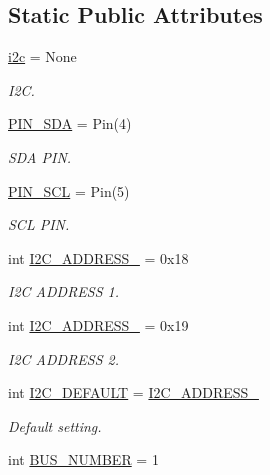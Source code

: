 \subsection*{Static Public Attributes}
\begin{DoxyCompactItemize}
\item 
\mbox{\hyperlink{classlis3dh_1_1_l_i_s3_d_h_aa3bcba9af502b92295a35c8279c7f0da}{i2c}} = None
\begin{DoxyCompactList}\small\item\em I2C. \end{DoxyCompactList}\item 
\mbox{\hyperlink{classlis3dh_1_1_l_i_s3_d_h_a15273c12fca6040cc939d3b5dd7d4758}{P\+I\+N\+\_\+\+S\+DA}} = Pin(4)
\begin{DoxyCompactList}\small\item\em S\+DA P\+IN. \end{DoxyCompactList}\item 
\mbox{\hyperlink{classlis3dh_1_1_l_i_s3_d_h_ae9d34cc7a560c739e79945b32e53f90f}{P\+I\+N\+\_\+\+S\+CL}} = Pin(5)
\begin{DoxyCompactList}\small\item\em S\+CL P\+IN. \end{DoxyCompactList}\item 
int \mbox{\hyperlink{classlis3dh_1_1_l_i_s3_d_h_ae2ba26cbff3d129c8eed8afc96c2cf04}{I2\+C\+\_\+\+A\+D\+D\+R\+E\+S\+S\+\_}} = 0x18
\begin{DoxyCompactList}\small\item\em I2C A\+D\+D\+R\+E\+SS 1. \end{DoxyCompactList}\item 
int \mbox{\hyperlink{classlis3dh_1_1_l_i_s3_d_h_af9ed734c897abbeddad5f3d3bf0bfbb5}{I2\+C\+\_\+\+A\+D\+D\+R\+E\+S\+S\+\_}} = 0x19
\begin{DoxyCompactList}\small\item\em I2C A\+D\+D\+R\+E\+SS 2. \end{DoxyCompactList}\item 
int \mbox{\hyperlink{classlis3dh_1_1_l_i_s3_d_h_af6b66a20ed2112e95c14ce7b58697d9f}{I2\+C\+\_\+\+D\+E\+F\+A\+U\+LT}} = \mbox{\hyperlink{classlis3dh_1_1_l_i_s3_d_h_ae2ba26cbff3d129c8eed8afc96c2cf04}{I2\+C\+\_\+\+A\+D\+D\+R\+E\+S\+S\+\_}}
\begin{DoxyCompactList}\small\item\em Default setting. \end{DoxyCompactList}\item 
int \mbox{\hyperlink{classlis3dh_1_1_l_i_s3_d_h_a6dd4e8c65978e98d0f3765ff58552fc8}{B\+U\+S\+\_\+\+N\+U\+M\+B\+ER}} = 1

\end{DoxyCompactItemize}
